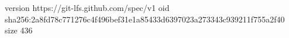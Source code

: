 version https://git-lfs.github.com/spec/v1
oid sha256:2a8fd78c771276c4f496bef31e1a85433d6397023a273343c939211f755a2f40
size 436
